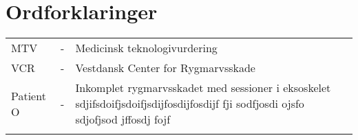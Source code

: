 
\chapter{Ordforklaringer}

\begin{table}[H]
\center
{}
\begin{tabularx}{\linewidth}{l l X}	
MTV         & - &   Medicinsk teknologivurdering \\ \addlinespace[2mm]
VCR         & - &   Vestdansk Center for Rygmarvsskade \\ \addlinespace[2mm]
Patient O   & - &   Inkomplet rygmarvsskadet med sessioner i eksoskelet sdjifsdoifjsdoifjsdijfosdijfosdijf fji sodfjosdi ojsfo sdjofjsod jffosdj fojf \\ \addlinespace[2mm]

\end{tabularx}
\end{table}


